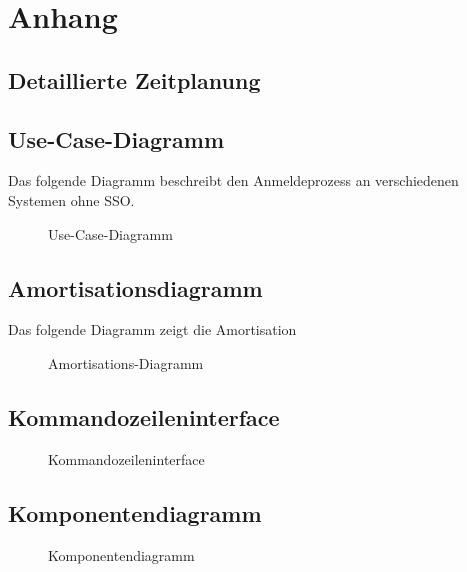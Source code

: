 \section{Anhang}
\subsection{Detaillierte Zeitplanung}
\label{app:Zeitplanung}





\clearpage

\subsection{Use-Case-Diagramm}
\label{app:Use-Case-Diagramm}
Das folgende Diagramm beschreibt den Anmeldeprozess an verschiedenen Systemen ohne \acs{SSO}.
\begin{figure}[htb]
\centering
{}
\caption{Use-Case-Diagramm}
\end{figure}
\clearpage

\subsection{Amortisationsdiagramm}
\label{app:Amortisationsdiagramm}
Das folgende Diagramm zeigt die Amortisation
\begin{figure}[htb]
\centering
{}
\caption{Amortisations-Diagramm}
\end{figure}
\clearpage

\subsection{Kommandozeileninterface}
\label{app:cli}
\begin{figure}[htb]
\centering
{}
\caption{Kommandozeileninterface}
\end{figure}
\clearpage

\subsection{Komponentendiagramm}
\label{app:Komponentendiagramm}
\begin{figure}[htb]
\centering
{}
\caption{Komponentendiagramm}
\end{figure}
\clearpage

